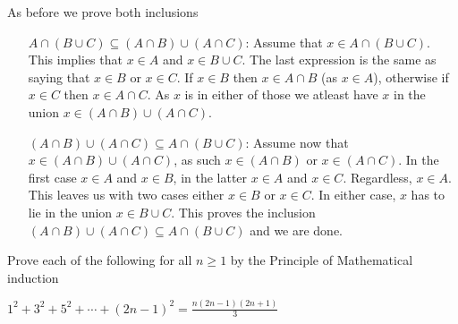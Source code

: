 \documentclass[a4paper, english, 12pt]{article} %
\newcommand{\solutions}{false} %
\begin{document}
\begin{answer}
  As before we prove both inclusions
  \begin{enumerate}[align=left]
    \item[$A \cap (B \cup C) \subseteq (A \cap B) \cup (A \cap C)$:] Assume that
      $x \in A \cap (B \cup C)$. This implies that $x \in A$ and $x \in B \cup
      C$. The last expression is the same as saying that $x \in B$ or $x \in C$.
      If $x \in B$ then $x \in A \cap B$ (as $x \in A$), otherwise if $x \in C$ then $x \in A
      \cap C$. As $x$ is in either of those we atleast have $x$ in the union $x
      \in (A \cap B) \cup (A \cap C)$.
    \item[$(A \cap B) \cup (A \cap C) \subseteq A \cap (B \cup C)$:]
      Assume now that $x \in (A \cap B) \cup (A \cap C)$, as such $x \in (A \cap
      B)$ or $x \in (A \cap C)$. In the first case $x \in A$ and $x \in B$, in
      the latter $x \in A$ and $x \in C$. Regardless, $x \in A$. This leaves us
      with two cases either $x \in B$ or $x \in C$. In either case, $x$ has to
      lie in the union $x \in B \cup C$. This proves the inclusion
      $(A \cap B) \cup (A \cap C) \subseteq A \cap (B \cup C)$ and we are
      done.  
  \end{enumerate} 
\end{answer}

\ifthenelse{\boolean{\solutions}}{\newpage}{}



\begin{problem}
  Prove each of the following for all $n \geq 1$ by the Principle of
  Mathematical induction
\end{problem}

\begin{subproblem}
  $\displaystyle 1^2 + 3^2 + 5^2 + \cdots + (2n-1)^2 = \frac{n(2n-1)(2n+1)}{3}$
\end{subproblem}
\end{document}
